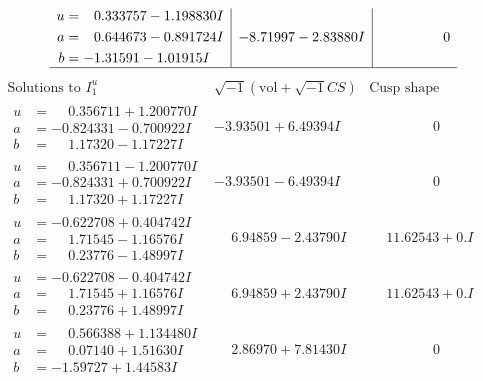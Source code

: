 \documentclass[1p]{elsarticle_modified}
\theoremstyle{definition}
\newcommand{\I}{\sqrt{-1}}
\begin{document}
$$\begin{array}{c|c|c}
\begin{aligned}
u &= \phantom{-}0.333757 - 1.198830 I \\
a &= \phantom{-}0.644673 - 0.891724 I \\
b &= -1.31591 - 1.01915 I\end{aligned}
 & -8.71997 - 2.83880 I & \phantom{-0.000000 } 0\\
 \hline 
 \end{array}$$\newpage$$\begin{array}{c|c|c}  
\text{Solutions to }I^u_{1}& \I (\text{vol} + \sqrt{-1}CS) & \text{Cusp shape}\\
 \hline 
\begin{aligned}
u &= \phantom{-}0.356711 + 1.200770 I \\
a &= -0.824331 - 0.700922 I \\
b &= \phantom{-}1.17320 - 1.17227 I\end{aligned}
 & -3.93501 + 6.49394 I & \phantom{-0.000000 } 0 \\ \hline\begin{aligned}
u &= \phantom{-}0.356711 - 1.200770 I \\
a &= -0.824331 + 0.700922 I \\
b &= \phantom{-}1.17320 + 1.17227 I\end{aligned}
 & -3.93501 - 6.49394 I & \phantom{-0.000000 } 0 \\ \hline\begin{aligned}
u &= -0.622708 + 0.404742 I \\
a &= \phantom{-}1.71545 - 1.16576 I \\
b &= \phantom{-}0.23776 - 1.48997 I\end{aligned}
 & \phantom{-}6.94859 - 2.43790 I & \phantom{-}11.62543 + 0. I\phantom{ +0.000000I} \\ \hline\begin{aligned}
u &= -0.622708 - 0.404742 I \\
a &= \phantom{-}1.71545 + 1.16576 I \\
b &= \phantom{-}0.23776 + 1.48997 I\end{aligned}
 & \phantom{-}6.94859 + 2.43790 I & \phantom{-}11.62543 + 0. I\phantom{ +0.000000I} \\ \hline\begin{aligned}
u &= \phantom{-}0.566388 + 1.134480 I \\
a &= \phantom{-}0.07140 + 1.51630 I \\
b &= -1.59727 + 1.44583 I\end{aligned}
 & \phantom{-}2.86970 + 7.81430 I & \phantom{-0.000000 } 0 \\ \hline\begin{aligned}

\end{aligned}
\end{array}$$
\end{document}
